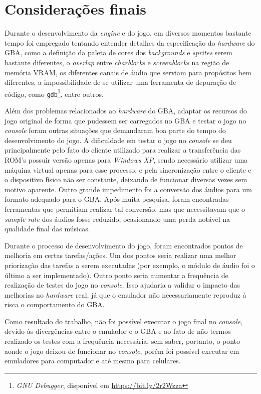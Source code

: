 \chapter[Considerações finais]{Considerações finais}

Durante o desenvolvimento da \textit{engine} e do jogo, em diversos momentos bastante tempo foi empregado tentando entender detalhes da especificação do \textit{hardware} do GBA, como a definição da paleta de cores dos \textit{backgrounds} e \textit{sprites} serem bastante diferentes, o \textit{overlap} entre \textit{charblocks} e \textit{screenblocks} na região de memória VRAM, os diferentes canais de áudio que serviam para propósitos bem diferentes, a impossibilidade de se utilizar uma ferramenta de depuração de código, como \texttt{gdb}\footnote{\textit{GNU Debugger}, disponível em \url{https://bit.ly/2r2Wzza}}, entre outros.

Além dos problemas relacionados ao \textit{hardware} do GBA, adaptar os recursos do jogo original de forma que pudessem ser carregados no GBA e testar o jogo no \textit{console} foram outras situações que demandaram boa parte do tempo do desenvolvimento do jogo. A dificuldade em testar o jogo no \textit{console} se deu principalmente pelo fato do cliente utilizado para realizar a transferência das ROM's possuir versão apenas para \textit{Windows XP}, sendo necessário utilizar uma máquina virtual apenas para esse processo, e pela sincronização entre o cliente e o dispositivo físico não ser constante, deixando de funcionar diversas vezes sem motivo aparente. Outro grande impedimento foi a conversão dos áudios para um formato adequado para o GBA. Após muita pesquisa, foram encontradas ferramentas que permitiam realizar tal conversão, mas que necessitavam que o \textit{sample rate} dos áudios fosse reduzido, ocasionando uma perda notável na qualidade final das músicas. 

Durante o processo de desenvolvimento do jogo, foram encontrados pontos de melhoria em certas tarefas/ações. Um dos pontos seria realizar uma melhor priorização das tarefas a serem executadas (por exemplo, o módulo de áudio foi o último a ser implementado). Outro ponto seria aumentar a frequência de realização de testes do jogo no \textit{console}. Isso ajudaria a validar o impacto das melhorias no \textit{hardware} real, já que o emulador não necessariamente reproduz à risca o comportamento do GBA.

Como resultado do trabalho, não foi possível executar o jogo final no \textit{console}, devido às divergências entre o emulador e o GBA e ao fato de não termos realizado os testes com a frequência necessária, sem saber, portanto, o ponto aonde o jogo deixou de funcionar no \textit{console}, porém foi possível executar em emuladores para computador e até mesmo para celulares.

